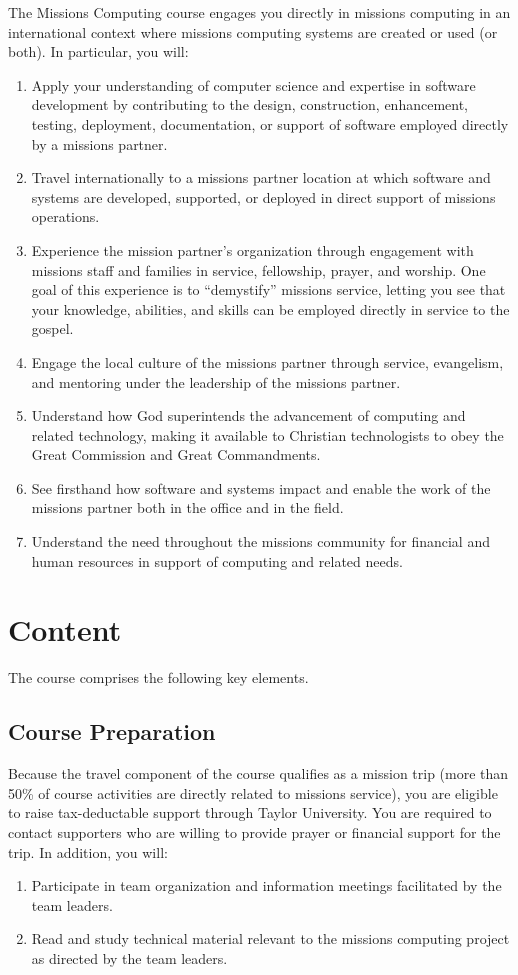 \documentclass[11pt]{article}
\begin{document}
The Missions Computing course engages you directly
in missions computing in an international context
where missions computing systems are created or used (or both).
In particular, you will:
\begin{enumerate}
\item
  Apply your understanding of computer science
  and expertise in software development by
  contributing to the design, construction, enhancement, testing, deployment,
  documentation, or support of software
  employed directly by a missions partner.
\item
  Travel internationally to a missions partner location
  at which software and systems are developed, supported, or deployed
  in direct support of missions operations.
\item
  Experience the mission partner’s organization
  through engagement with missions staff and families
  in service, fellowship, prayer, and worship.
  One goal of this experience is to
  ``demystify'' missions service,
  letting you see that your knowledge, abilities, and skills
  can be employed directly in service to the gospel.
\item
  Engage the local culture of the missions partner
  through service, evangelism, and mentoring
  under the leadership of the missions partner.
\item
  Understand how God superintends
  the advancement of computing and related technology,
  making it available to Christian technologists
  to obey the Great Commission and Great Commandments.
\item
  See firsthand how software and systems
  impact and enable the work of the missions
  partner both in the office and in the field.
\item
  Understand the need throughout the missions community
  for financial and human resources
  in support of computing and related needs.
\end{enumerate}

\section{Content}

The course comprises the following key elements.

\subsection{Course Preparation}

Because the travel component of the course
qualifies as a mission trip
(more than 50\% of course activities
are directly related to missions service),
you are eligible to raise
tax-deductable support through Taylor University.
You are required to contact supporters who are willing
to provide prayer or financial support for the trip.
In addition, you will:
\begin{enumerate}
\item
  Participate in team organization and information meetings
  facilitated by the team leaders.
\item
  Read and study technical material
  relevant to the missions computing project
  as directed by the team leaders.
\end{enumerate}
\end{document}
